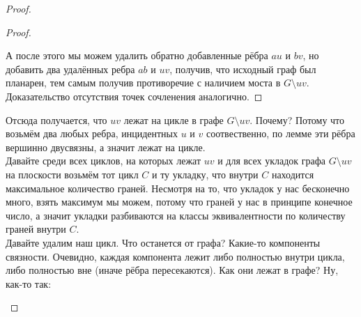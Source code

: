 \documentclass{article}
\begin{document}
\begin{proof}
\begin{proof}
\begin{figure}[H]
            \end{figure}\noindent
            А после этого мы можем удалить обратно добавленные рёбра $au$ и $bv$, но добавить два удалённых ребра $ab$ и $uv$, получив, что исходный граф был планарен, тем самым получив противоречие с наличием моста в $G\setminus uv$.\\
            Доказательство отсутствия точек сочленения аналогично.
        \end{proof}
        Отсюда получается, что $uv$ лежат на цикле в графе $G\setminus uv$. Почему? Потому что возьмём два любых ребра, инцидентных $u$ и $v$ соотвественно, по лемме эти рёбра вершинно двусвязны, а значит лежат на цикле.\\
        Давайте среди всех циклов, на которых лежат $uv$ и для всех укладок графа $G\setminus uv$ на плоскости возьмём тот цикл $C$ и ту укладку, что внутри $C$ находится максимальное количество граней. Несмотря на то, что укладок у нас бесконечно много, взять максимум мы можем, потому что граней у нас в принципе конечное число, а значит укладки разбиваются на классы эквивалентности по количеству граней внутри $C$.\\
        Давайте удалим наш цикл. Что останется от графа? Какие-то компоненты связности. Очевидно, каждая компонента лежит либо полностью внутри цикла, либо полностью вне (иначе рёбра пересекаются). Как они лежат в графе? Ну, как-то так:
        \begin{figure}[H]
\end{figure}
\end{proof}
\end{document}
